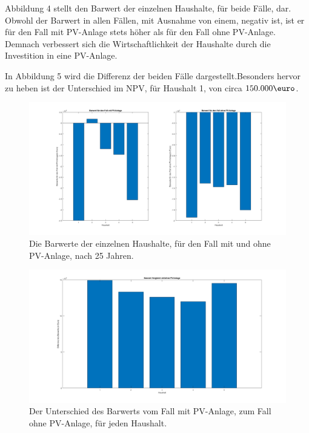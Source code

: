 \documentclass[a4paper,12pt]{article}
\begin{document}
	Abbildung 4 stellt den Barwert der einzelnen Haushalte, für beide Fälle, dar. Obwohl der Barwert in allen Fällen, mit Ausnahme von einem, negativ ist, ist er für den Fall mit PV-Anlage stets höher als für den Fall ohne PV-Anlage. Demnach verbessert sich die Wirtschaftlichkeit der Haushalte durch die Investition in eine PV-Anlage.\\ \par
	\noindent In Abbildung 5 wird die Differenz der beiden Fälle dargestellt.\newline Besonders hervor zu heben ist der Unterschied im NPV, für Haushalt 1, von circa $150.000\mbox{\euro}$.
	\begin{figure}[H]
		\centering
		\includegraphics[width=12cm]{img/results/HaushalteBarwerte}
		\caption{Die Barwerte der einzelnen Haushalte, für den Fall mit und ohne PV-Anlage, nach 25 Jahren.}
	\end{figure}
	\begin{figure}[H]
		\centering
		\includegraphics[width=12cm]{img/results/VergleichBarwertMitOhne}
		\caption{Der Unterschied des Barwerts vom Fall mit PV-Anlage, zum Fall ohne PV-Anlage, für jeden Haushalt.}
	\end{figure}
\end{document}
